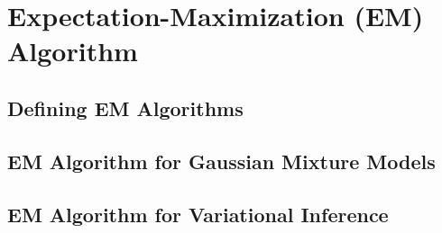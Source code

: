 \section{Expectation-Maximization (EM) Algorithm}
\subsection{Defining EM Algorithms}
\subsection{EM Algorithm for Gaussian Mixture Models}
\subsection{EM Algorithm for Variational Inference}